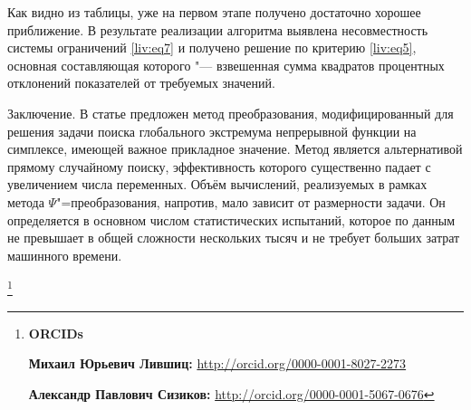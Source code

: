 Как видно из таблицы, уже на первом этапе получено достаточно хорошее приближение. В результате реализации алгоритма выявлена несовместность системы ограничений \eqref{liv:eq7} и получено решение по критерию \eqref{liv:eq5}, основная составляющая которого "--- взвешенная сумма квадратов процентных отклонений показателей от требуемых значений.



Заключение. В статье предложен метод  преобразования, модифицированный для решения задачи поиска глобального экстремума непрерывной функции на симплексе, имеющей важное прикладное значение.  Метод является альтернативой прямому случайному поиску, эффективность которого существенно падает с увеличением числа переменных. Объём вычислений, реализуемых в рамках метода $\Psi$"=преобразования, напротив, мало зависит от размерности задачи. Он определяется в основном числом статистических испытаний, которое по данным \cite{liv:bib:14} не превышает в общей сложности нескольких тысяч и не требует больших затрат машинного времени.   









\thanks{{\bf ORCIDs}



{\bf Михаил Юрьевич Лившиц:} \url{http://orcid.org/0000-0001-8027-2273}



{\bf Александр Павлович Сизиков:} \url{http://orcid.org/0000-0001-5067-0676}



}





\RusRef

